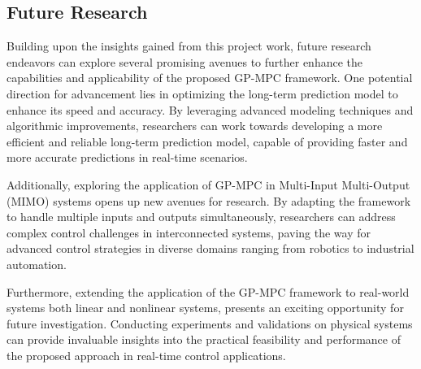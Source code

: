 \subsection{Future Research}
Building upon the insights gained from this project work, future research endeavors can explore several promising avenues to further enhance the capabilities and applicability of the proposed GP-MPC framework. One potential direction for advancement lies in optimizing the long-term prediction model to enhance its speed and accuracy. By leveraging advanced modeling techniques and algorithmic improvements, researchers can work towards developing a more efficient and reliable long-term prediction model, capable of providing faster and more accurate predictions in real-time scenarios.

Additionally, exploring the application of GP-MPC in Multi-Input Multi-Output (MIMO) systems opens up new avenues for research. By adapting the framework to handle multiple inputs and outputs simultaneously, researchers can address complex control challenges in interconnected systems, paving the way for advanced control strategies in diverse domains ranging from robotics to industrial automation.

Furthermore, extending the application of the GP-MPC framework to real-world systems both linear and nonlinear systems, presents an exciting opportunity for future investigation. Conducting experiments and validations on physical systems can provide invaluable insights into the practical feasibility and performance of the proposed approach in real-time control applications. 



